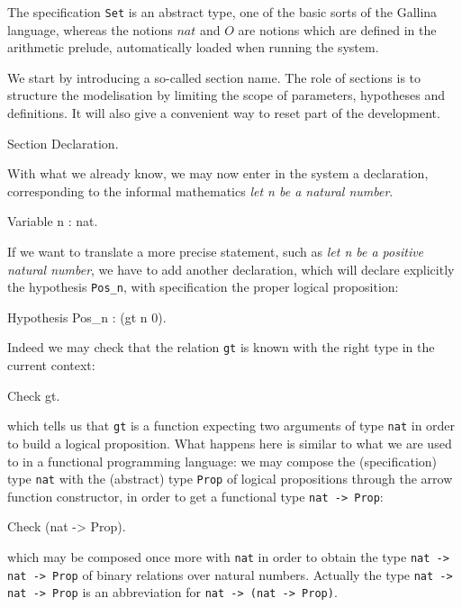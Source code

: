 \documentclass[11pt,a4paper]{book}
\begin{document}
The specification \verb:Set: is an abstract type, one of the basic
sorts of the Gallina language, whereas the notions $nat$ and $O$ are
notions which are defined in the arithmetic prelude,
automatically loaded when running the \Coq{} system.

We start by introducing a so-called section name. The role of sections
is to structure the modelisation by limiting the scope of parameters,
hypotheses and definitions. It will also give a convenient way to
reset part of the development.

\begin{coq_example}
Section Declaration.
\end{coq_example}
With what we already know, we may now enter in the system a declaration,
corresponding to the informal mathematics {\sl let n be a natural
  number}. 

\begin{coq_example}
Variable n : nat.
\end{coq_example}

If we want to translate a more precise statement, such as
{\sl let n be a positive natural number},
we have to add another declaration, which will declare explicitly the
hypothesis \verb:Pos_n:, with specification the proper logical
proposition:
\begin{coq_example}
Hypothesis Pos_n : (gt n 0).
\end{coq_example}

Indeed we may check that the relation \verb:gt: is known with the right type
in the current context:

\begin{coq_example}
Check gt.
\end{coq_example}

which tells us that \texttt{gt} is a function expecting two arguments of
type \texttt{nat} in order to build a logical proposition.
What happens here is similar to what we are used to in a functional
programming language: we may compose the (specification) type \texttt{nat}
with the (abstract) type \texttt{Prop} of logical propositions through the
arrow function constructor, in order to get a functional type
\texttt{nat -> Prop}:
\begin{coq_example}
Check (nat -> Prop).
\end{coq_example}
which may be composed once more with \verb:nat: in order to obtain the
type \texttt{nat -> nat -> Prop} of binary relations over natural numbers.
Actually the type \texttt{nat -> nat -> Prop} is an abbreviation for 
\texttt{nat -> (nat -> Prop)}.
\end{document}
